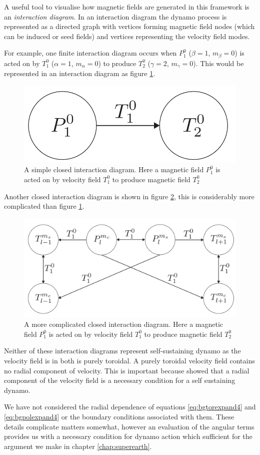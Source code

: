 A useful tool to visualise how magnetic fields are generated in this framework is an \emph{interaction diagram}. In an interaction diagram the dynamo process is represented as a directed graph with vertices forming magnetic field nodes (which can be induced or seed fields) and vertices representing the velocity field modes. 

For example, one finite interaction diagram occurs when $P_1^0$ ($\beta=1$, $m_\beta=0$) is acted on by $T_1^0$ ($\alpha=1$, $m_\alpha=0$) to produce $T_2^0$ ($\gamma=2$, $m_\gamma=0$). This would be represented in an interaction diagram as figure \ref{fig:interaction-differentialrotation}.
\begin{figure}
	\centering
	\noindent\includegraphics[width=.45\linewidth]{Appendix1/figures/interaction-differentialrotation.pdf}
	\caption{A simple closed interaction diagram. Here a magnetic field $P_1^0$ is acted on by velocity field $T_1^0$ to produce magnetic field $T_2^0$}
	\label{fig:interaction-differentialrotation}
\end{figure}
Another closed interaction diagram is shown in figure \ref{interaction-complicated.pdf}, this is considerably more complicated than figure \ref{fig:interaction-differentialrotation}.
\begin{figure}
	\centering
	\noindent\includegraphics[width=\linewidth]{Appendix1/figures/interaction-complicated.pdf}
	\caption{A more complicated closed interaction diagram. Here a magnetic field $P_1^0$ is acted on by velocity field $T_1^0$ to produce magnetic field $T_2^0$}
	\label{interaction-complicated.pdf}
\end{figure}
Neither of these interaction diagrams represent self-sustaining dynamo as the velocity field is in both is purely toroidal. A purely toroidal velocity field contains no radial component of velocity. This is important because \citet{busse1975} showed that a radial component of the velocity field is a necessary condition for a self sustaining dynamo. 

We have not considered the radial dependence of equations \ref{eq:bgtorexpand4} and \ref{eq:bgpolexpand4} or the boundary conditions associated with them. These details complicate matters somewhat, however an evaluation of the angular terms provides us with a necessary condition for dynamo action which sufficient for the argument we make in chapter \ref{chap:superearth}.
